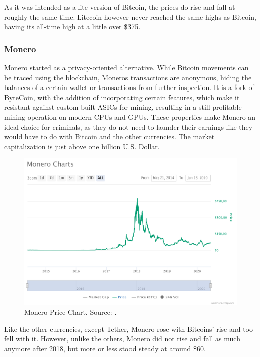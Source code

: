 \documentclass[11pt,a4paper,compsoc,conference]{IEEEtran}
\begin{document}
As it was intended as a lite version of Bitcoin, the prices do rise and fall at roughly the same time. Litecoin however never reached the same highs as Bitcoin, having its all-time high at a little over \$375. 

\subsubsection{Monero}
Monero started as a privacy-oriented alternative. While Bitcoin movements can be traced using the blockchain, Moneros transactions are anonymous, hiding the balances of a certain wallet or transactions from further inspection. It is a fork of ByteCoin, with the addition of incorporating certain features, which make it resistant against custom-built ASICs for mining, resulting in a still profitable mining operation on modern CPUs and GPUs. These properties make Monero an ideal choice for criminals, as they do not need to launder their earnings like they would have to do with Bitcoin and the other currencies. The market capitalization is just above one billion U.S. Dollar.

\begin{figure}[H]
    \centering
    \includegraphics[width=\linewidth]{figures/monero-charts.pdf}
    \caption[Monero Price Chart]{Monero Price Chart. Source: \citep{coinmarketcap}. }
    \label{fig:Monero}
\end{figure}

Like the other currencies, except Tether, Monero rose with Bitcoins' rise and too fell with it.  However, unlike the others, Monero did not rise and fall as much anymore after 2018, but more or less stood steady at around \$60.  
\end{document}
